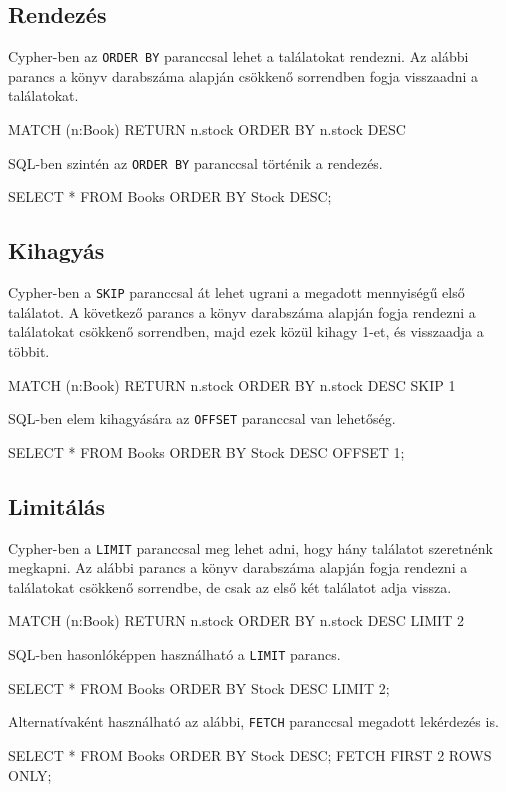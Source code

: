 \subsection{Rendezés}
Cypher-ben az \texttt{ORDER BY} paranccsal lehet a találatokat rendezni. Az alábbi parancs a könyv darabszáma alapján csökkenő sorrendben fogja visszaadni a találatokat.
\begin{java}[columns=fullflexible]
MATCH (n:Book) 
RETURN n.stock 
ORDER BY n.stock DESC
\end{java}
SQL-ben szintén az \texttt{ORDER BY} paranccsal történik a rendezés.
\begin{java}[columns=fullflexible]
SELECT * 
FROM Books 
ORDER BY Stock DESC;
\end{java}

\subsection{Kihagyás}
Cypher-ben a \texttt{SKIP} paranccsal át lehet ugrani a megadott mennyiségű első találatot. A következő parancs a könyv darabszáma alapján fogja rendezni a találatokat csökkenő sorrendben, majd ezek közül kihagy 1-et, és visszaadja a többit.
\begin{java}[columns=fullflexible]
MATCH (n:Book) 
RETURN n.stock 
ORDER BY n.stock DESC
SKIP 1
\end{java}
SQL-ben elem kihagyására az \texttt{OFFSET} paranccsal van lehetőség.
\begin{java}[columns=fullflexible]
SELECT * 
FROM Books 
ORDER BY Stock DESC
OFFSET 1;
\end{java}

\subsection{Limitálás}
Cypher-ben a \texttt{LIMIT} paranccsal meg lehet adni, hogy hány találatot szeretnénk megkapni. Az alábbi parancs a könyv darabszáma alapján fogja rendezni a találatokat csökkenő sorrendbe, de csak az első két találatot adja vissza.
\begin{java}[columns=fullflexible]
MATCH (n:Book) 
RETURN n.stock 
ORDER BY n.stock DESC
LIMIT 2
\end{java}
SQL-ben hasonlóképpen használható a \texttt{LIMIT} parancs.
\begin{java}[columns=fullflexible]
SELECT *
FROM Books 
ORDER BY Stock DESC
LIMIT 2;
\end{java}
Alternatívaként használható az alábbi, \texttt{FETCH} paranccsal megadott lekérdezés is.
\begin{java}[columns=fullflexible]
SELECT *
FROM Books 
ORDER BY Stock DESC;
FETCH FIRST 2 ROWS ONLY;
\end{java}

